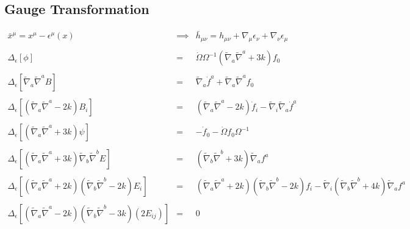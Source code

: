 \documentclass[10pt,letterpaper]{article}
\numberwithin{equation}{section}
\begin{document}
\subsection{Gauge Transformation}
\begin{eqnarray}
\bar x^\mu =  x^\mu - \epsilon^\mu(x) &\implies&  \bar h_{\mu\nu} = h_{\mu\nu} + \nabla_\mu \epsilon_\nu + \nabla_\nu \epsilon_\mu
\\ \nonumber\\
\Delta_\epsilon\left[ \phi \right]&=&  \dot{\Omega} \Omega^{-1} (\tilde{\nabla}_{a}\tilde{\nabla}^{a}+3k)f_{0}{}
\\ \nonumber\\
\Delta_\epsilon\left[ \tilde\nabla_a\tilde\nabla^a B \right] &=& \tilde{\nabla}_{a}\dot{f}^{a} + \tilde{\nabla}_{a}\tilde{\nabla}^{a}f_{0}{}
\\ \nonumber\\
\Delta_\epsilon\left[ (\tilde\nabla_a\tilde\nabla^a -2k)B_i \right] &=& (\tilde{\nabla}_{a}\tilde{\nabla}^{a}-2k)\dot{f}_{i} -  \tilde{\nabla}_{i}\tilde{\nabla}_{a}\dot{f}^{a}
\\ \nonumber\\
\Delta_\epsilon\left[(\tilde\nabla_a\tilde\nabla^a +3 k)\psi \right] &=& - \dot{f}_{0}{} -  \dot{\Omega} f_{0}{} \Omega^{-1}
\\ \nonumber\\
\Delta_\epsilon\left[ (\tilde\nabla_a\tilde\nabla^a +3 k)\tilde\nabla_b\tilde\nabla^b E \right] &=&(\tilde{\nabla}_{b}\tilde{\nabla}^{b}+3k)\tilde{\nabla}_{a}f^{a}
\\ \nonumber\\
\Delta_\epsilon\left[(\tilde\nabla_a\tilde\nabla^a +2 k)(\tilde\nabla_b\tilde\nabla^b-2k) E_i \right] &=& (\tilde\nabla_a\tilde\nabla^a +2 k)(\tilde\nabla_b\tilde\nabla^b-2k)f_{i} -  \tilde{\nabla}_{i}(\tilde{\nabla}_{b}\tilde{\nabla}^{b}+4k)\tilde{\nabla}_{a}f^{a}
\\ \nonumber\\
\Delta_\epsilon\left[(\tilde\nabla_a\tilde\nabla^a-2k)(\tilde\nabla_b\tilde\nabla^b -3k)(2E_{ij}) \right] &=& 0
\end{eqnarray}
\end{document}
